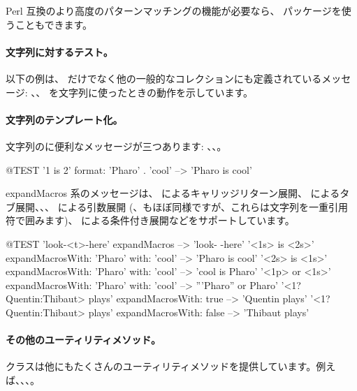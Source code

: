 \documentclass[a4paper,10pt,twoside]{book}
\begin{document}
Perl 互換のより高度のパターンマッチングの機能が必要なら、 パッケージを使うこともできます。

\paragraph{文字列に対するテスト。} 以下の例は、 だけでなく他の一般的なコレクションにも定義されているメッセージ: 、、 を文字列に使ったときの動作を示しています。


\paragraph{文字列のテンプレート化。}
文字列のに便利なメッセージが三つあります: 、、。

\begin{code}{@TEST}
'{1} is {2}' format: {'Pharo' . 'cool'}  --> 'Pharo is cool'
\end{code}

expandMacros 系のメッセージは、 によるキャリッジリターン展開、 によるタブ展開、、、 による引数展開 (、もほぼ同様ですが、これらは文字列を一重引用符で囲みます)、 による条件付き展開などをサポートしています。

\begin{code}{@TEST}
'look-<t>-here' expandMacros                                         --> 'look-	-here'
'<1s> is <2s>' expandMacrosWith: 'Pharo' with: 'cool'   --> 'Pharo is cool'
'<2s> is <1s>' expandMacrosWith: 'Pharo' with: 'cool'   --> 'cool is Pharo'
'<1p> or <1s>' expandMacrosWith: 'Pharo' with: 'cool'  --> '''Pharo'' or Pharo'
'<1?Quentin:Thibaut> plays' expandMacrosWith: true     --> 'Quentin plays'
'<1?Quentin:Thibaut> plays' expandMacrosWith: false    --> 'Thibaut plays'
\end{code}

\paragraph{その他のユーティリティメソッド。}
 クラスは他にもたくさんのユーティリティメソッドを提供しています。例えば、、、。
\end{document}

